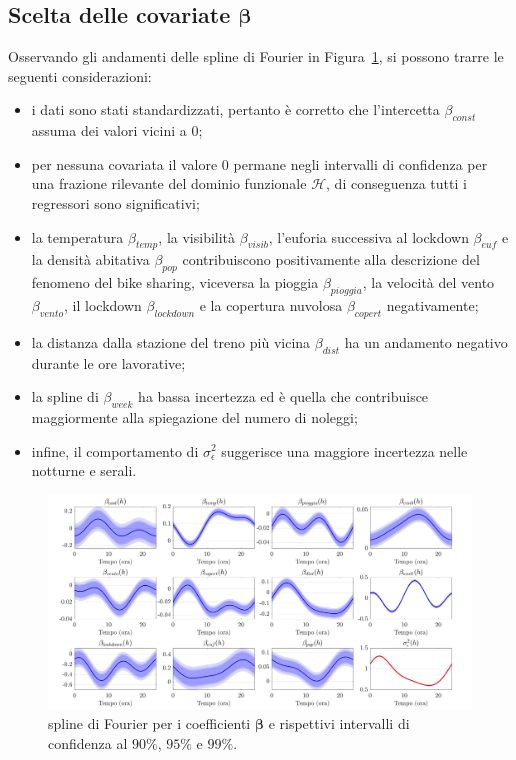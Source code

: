 \subsection{Scelta delle covariate $\boldsymbol{\beta}$}
Osservando gli andamenti delle spline di Fourier in Figura~\ref{trend_beta}, si possono trarre le seguenti considerazioni:
\begin{itemize}
	\item i dati sono stati standardizzati, pertanto è corretto che l'intercetta $\beta_{const}$ assuma dei valori vicini a \num{0};
	\item per nessuna covariata il valore \num{0} permane negli intervalli di confidenza per una frazione rilevante del dominio funzionale $\mathcal{H}$, di conseguenza tutti i regressori sono significativi;
	\item la temperatura $\beta_{temp}$, la visibilità $\beta_{visib}$, l'euforia successiva al lockdown $\beta_{euf}$ e la densità abitativa $\beta_{pop}$ contribuiscono positivamente alla descrizione del fenomeno del bike sharing, viceversa la pioggia $\beta_{pioggia}$, la velocità del vento $\beta_{vento}$, il lockdown $\beta_{lockdown}$ e la copertura nuvolosa $\beta_{copert}$ negativamente;
	\item la distanza dalla stazione del treno più vicina $\beta_{dist}$ ha un andamento negativo durante le ore lavorative;
	\item la spline di $\beta_{week}$ ha bassa incertezza ed è quella che contribuisce maggiormente alla spiegazione del numero di noleggi;
	\item infine, il comportamento di $\sigma_\epsilon^2$ suggerisce una maggiore incertezza nelle notturne e serali. 
\end{itemize}

\begin{figure}[htpb]
	\centering
	\includegraphics[height=215px]{Immagini/4. Caso di studio/Model selection/Trend spline, rho=100m}
	\caption[Spline di Fourier per i coefficienti $\boldsymbol{\beta}$ e rispettivi intervalli di confidenza]{spline di Fourier per i coefficienti $\boldsymbol{\beta}$ e rispettivi intervalli di confidenza al $90\%$, $95\%$ e $99\%$.}
	\label{trend_beta}
\end{figure}

